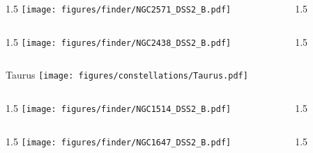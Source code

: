 \documentclass[final]{beamer}
\newlength{\colwidth}
\begin{document}

\begin{frame}[t]{}
    \begin{columns}[T]
        \begin{column}{1.5\colwidth}
            \centering
            \texttt{[image: figures/finder/NGC2571\_DSS2\_B.pdf]}
        \end{column}
        \begin{column}{1.5\colwidth}
            \Large
            
        \end{column}
    \end{columns}
    \vspace{\fill}
    \begin{columns}[T]
        \begin{column}{1.5\colwidth}
            \centering
            \texttt{[image: figures/finder/NGC2438\_DSS2\_B.pdf]}
        \end{column}
        \begin{column}{1.5\colwidth}
            \Large
            
        \end{column}
    \end{columns}
\end{frame}


\begin{frame}[t]{\LARGE Taurus}
    \centering
    \texttt{[image: figures/constellations/Taurus.pdf]}
\end{frame}


\begin{frame}[t]{}
    \begin{columns}[T]
        \begin{column}{1.5\colwidth}
            \centering
            \texttt{[image: figures/finder/NGC1514\_DSS2\_B.pdf]}
        \end{column}
        \begin{column}{1.5\colwidth}
            \Large
            
        \end{column}
    \end{columns}
    \vspace{\fill}
    \begin{columns}[T]
        \begin{column}{1.5\colwidth}
            \centering
            \texttt{[image: figures/finder/NGC1647\_DSS2\_B.pdf]}
        \end{column}
        \begin{column}{1.5\colwidth}
            \Large
            
        \end{column}
    \end{columns}
\end{frame}
\end{document}

